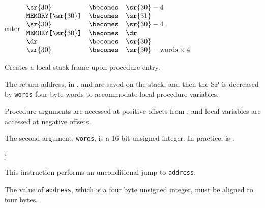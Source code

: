 \begin{instruction}{enter}\label{inst:enter}
  {
    \begin{math}
      \begin{array}{lcl}
                                  \sr{30} & \becomes &  \sr{30} - 4 \\
        \texttt{MEMORY[\textrm{\sr{30}}]} & \becomes &  \sr{31} \\
                                  \sr{30} & \becomes &  \sr{30} - 4 \\
        \texttt{MEMORY[\textrm{\sr{30}}]} & \becomes &  \dr \\
                                      \dr & \becomes &  \sr{30} \\
                                  \sr{30} & \becomes &  \sr{30} - \textrm{words} \times 4 \\
      \end{array}
    \end{math}
  }
  {
    Creates a local stack frame upon procedure entry.

    The return address, in , and \dr are saved on the stack,
    and then the \ac{SP} is decreased by \texttt{words} four byte
    words to accommodate local procedure variables.

    Procedure arguments are accessed at positive offsets from \dr, and
    local variables are accessed at negative offsets.

    The second argument, \texttt{words}, is a 16 bit unsigned
    integer. In practice, \dr is .
  }
\end{instruction}



%
%


\begin{instruction}{j}
     {

       This instruction performs an unconditional jump to
       \texttt{address}.

       The value of \texttt{address}, which is a four byte unsigned
       integer, must be aligned to four bytes.
     }
\end{instruction}


